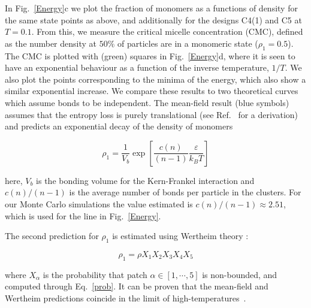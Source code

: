 \documentclass[a4paper, amsfonts, amssymb, amsmath, reprint, showkeys, nofootinbib, twoside]{revtex4-1}
\begin{document}
In Fig.~\ref{Energy}c we plot the fraction of monomers as a functions of density for the same state points as above, and additionally for the designs C4(1) and C5 at $T=0.1$.
From this, we measure the critical micelle concentration (CMC), defined as the number density at $50\%$ of particles are in a monomeric state ($\rho_1=0.5$). The CMC is plotted with (green) squares in Fig.~\ref{Energy}d, where it is seen to have an exponential behaviour as a function of the inverse temperature, $1/T$. We also plot the points corresponding to the minima of the energy, which also show a similar exponential increase. We compare these results to two theoretical curves which assume bonds to be independent.
The mean-field result (blue symbols) assumes that the entropy loss is purely translational (see Ref.~\cite{Kraft2012} for a derivation) and predicts an exponential decay of the density of monomers

\begin{equation}\label{meanfield}
\rho_1=\frac{1}{V_b}\exp[\frac{c(n)}{(n-1)} \frac{\varepsilon}{k_B T}]
\end{equation}

\noindent here, $V_b$ is the bonding volume for the Kern-Frankel interaction and $c(n)/(n-1)$ is the average number of bonds per particle in the clusters. For our Monte Carlo simulations the value estimated is $c(n)/(n-1)\approx 2.51$, which is used for the line in Fig.~\ref{Energy}.

The second prediction for $\rho_1$ is estimated using Wertheim theory \cite{Sciortino2007, Russo2021}:

\begin{equation}\label{wertheim}
\rho_1 = \rho X_1 X_2 X_3 X_4 X_5
\end{equation}

\noindent where $X_\alpha$ is the probability that patch $\alpha\in\left[1,\cdots, 5\right]$ is non-bounded, and computed through Eq.~\ref{prob}. It can be proven that the mean-field and Wertheim predictions coincide in the limit of high-temperatures~\cite{Russo2021}.


\end{document}
